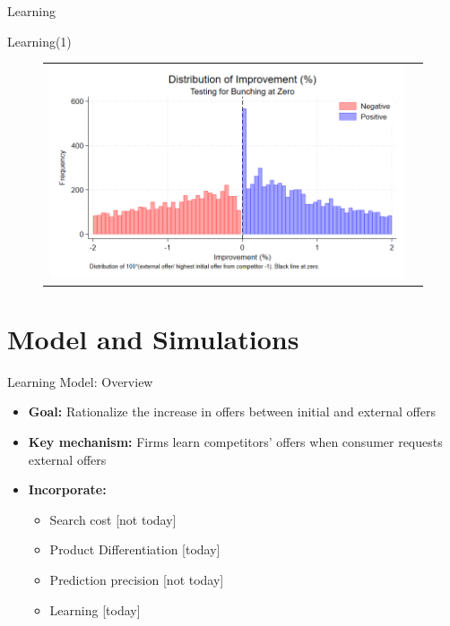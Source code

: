 \documentclass[10pt,aspectratio=169]{beamer}
\begin{document}
\begin{frame}{Learning}\label{slide:fig4}    
\scalebox{0.8}{
    
}
\hyperlink{slide:Descriptive_evidence}{}
\end{frame}


\begin{frame}{Learning(1)}\label{slide:fig5}
  \begin{figure}[H]
\centering{}%
\begin{tabular}{cc}
\includegraphics[scale=0.39]{../figures/IE7/IE7_hist_bunching_max(2).png} 
\end{tabular}
\end{figure}
\hyperlink{slide:Descriptive_evidence}{}
\end{frame}


\section{Model and Simulations}


\begin{frame}{Learning Model: Overview}
\begin{itemize}
    \item \textbf{Goal:} Rationalize the increase in offers between initial and external offers
    
    \item \textbf{Key mechanism:} Firms learn competitors' offers when consumer requests external offers
    


    \item \textbf{Incorporate:}
    \begin{itemize}
        \item Search cost [not today]
        \item Product Differentiation [today]
        \item Prediction precision [not today]
        \item Learning [today]
    \end{itemize}

\end{itemize}
\end{frame}
\end{document}
